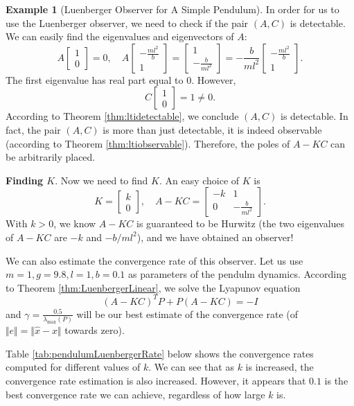 \documentclass[
]{book}
\theoremstyle{definition}
\theoremstyle{definition}
\newtheorem{example}{Example}[chapter]
\theoremstyle{definition}
\theoremstyle{definition}
\theoremstyle{remark}
\begin{document}
\begin{example}[Luenberger Observer for A Simple Pendulum]
In order for us to use the Luenberger observer, we need to check if the pair \((A,C)\) is detectable. We can easily find the eigenvalues and eigenvectors of \(A\):
\[
A \begin{bmatrix}
1 \\ 0
\end{bmatrix} = 0,\quad 
A \begin{bmatrix}
- \frac{ml^2}{b} \\ 1 
\end{bmatrix} = \begin{bmatrix}
1 \\ - \frac{b}{ml^2}
\end{bmatrix}
= - \frac{b}{ml^2} \begin{bmatrix}
- \frac{ml^2}{b} \\ 1 \end{bmatrix}.
\]
The first eigenvalue has real part equal to \(0\). However,
\[
C \begin{bmatrix}
1 \\ 0
\end{bmatrix} = 1 \neq 0.
\]
According to Theorem \ref{thm:ltidetectable}, we conclude \((A,C)\) is detectable. In fact, the pair \((A,C)\) is more than just detectable, it is indeed observable (according to Theorem \ref{thm:ltiobservable}). Therefore, the poles of \(A - KC\) can be arbitrarily placed.

\textbf{Finding \(K\)}. Now we need to find \(K\). An easy choice of \(K\) is
\[
K = \begin{bmatrix} k \\ 0 \end{bmatrix}, \quad A - KC = 
\begin{bmatrix}
- k & 1 \\ 0 & - \frac{b}{ml^2}
\end{bmatrix}.
\]
With \(k > 0\), we know \(A- KC\) is guaranteed to be Hurwitz (the two eigenvalues of \(A-KC\) are \(-k\) and \(-b/ml^2\)), and we have obtained an observer!

We can also estimate the convergence rate of this observer. Let us use \(m=1,g=9.8,l=1,b=0.1\) as parameters of the pendulm dynamics. According to Theorem \ref{thm:LuenbergerLinear}, we solve the Lyapunov equation
\[
(A - KC)^T P + P(A - KC) = -I
\]
and \(\gamma = \frac{0.5}{\lambda_{\max}(P)}\) will be our best estimate of the convergence rate (of \(\Vert e \Vert = \Vert \hat{x} - x \Vert\) towards zero).

Table \ref{tab:pendulumLuenbergerRate} below shows the convergence rates computed for different values of \(k\). We can see that as \(k\) is increased, the convergence rate estimation is also increased. However, it appears that \(0.1\) is the best convergence rate we can achieve, regardless of how large \(k\) is.


\end{example}
\end{document}
